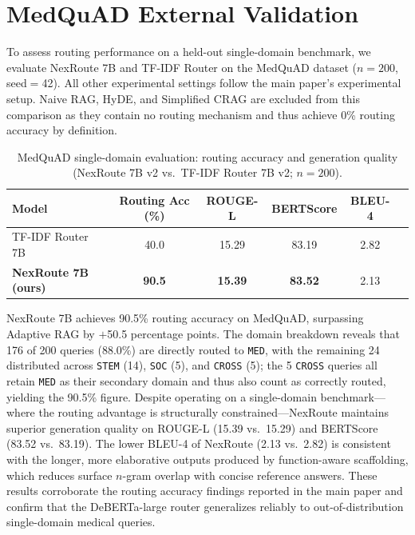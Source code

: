 \documentclass[a4paper,fleql,doubleblind]{cas-sc}
\begin{document}
\section{MedQuAD External Validation}
\label{supp:medquad}

To assess routing performance on a held-out single-domain benchmark, we
evaluate NexRoute 7B and TF-IDF Router on the MedQuAD dataset
\citep{ben2019question} ($n{=}200$, seed$=$42). All other experimental
settings follow the main paper's experimental setup. Naive RAG, HyDE, and
Simplified CRAG are excluded from this comparison as they contain no routing mechanism
and thus achieve 0\% routing accuracy by definition.

\begin{table}[h]
\centering
\caption{MedQuAD single-domain evaluation: routing accuracy and generation
quality (NexRoute 7B v2 vs.\ TF-IDF Router 7B v2; $n{=}200$).}
\label{tab:medquad}
\begin{tabular}{lccccc}
\toprule
\textbf{Model} & \textbf{Routing Acc (\%)} & \textbf{ROUGE-L} & \textbf{BERTScore} & \textbf{BLEU-4} \\
\midrule
TF-IDF Router 7B & 40.0 & 15.29 & 83.19 & 2.82 \\
\textbf{NexRoute 7B (ours)} & \textbf{90.5} & \textbf{15.39} & \textbf{83.52} & 2.13 \\
\bottomrule
\end{tabular}
\end{table}

NexRoute 7B achieves 90.5\% routing accuracy on MedQuAD, surpassing Adaptive
RAG by $+$50.5 percentage points. The domain breakdown reveals that 176 of
200 queries (88.0\%) are directly routed to \texttt{MED}, with the remaining
24 distributed across \texttt{STEM} (14), \texttt{SOC} (5), and \texttt{CROSS}
(5); the 5 \texttt{CROSS} queries all retain \texttt{MED} as their secondary
domain and thus also count as correctly routed, yielding the 90.5\% figure.
Despite operating on a single-domain benchmark---where the routing advantage
is structurally constrained---NexRoute maintains superior generation quality
on ROUGE-L (15.39 vs.\ 15.29) and BERTScore (83.52 vs.\ 83.19). The lower
BLEU-4 of NexRoute (2.13 vs.\ 2.82) is consistent with the longer, more
elaborative outputs produced by function-aware scaffolding, which reduces
surface $n$-gram overlap with concise reference answers. These results
corroborate the routing accuracy findings reported in the main paper and
confirm that the DeBERTa-large router generalizes reliably to
out-of-distribution single-domain medical queries.
\end{document}
